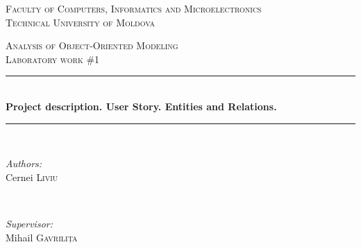 \documentclass[12pt,a4paper,titlepage]{article}
\begin{document}
\begin{titlepage}

  \begin{center} %

  \textsc{\large Faculty of Computers, Informatics and Microelectronics}\\[0.5cm]
  \textsc{\large Technical University of Moldova}\\[1.2cm] %
  \vspace{25 mm}

  \textsc{\Large Analysis of Object-Oriented Modeling}\\[0.5cm] %
  \textsc{\large Laboratory work \#1}\\[0.5cm] %

\newcommand{\HRule}{\rule{\linewidth}{0.5mm}} %

  \vspace{10 mm}
  \HRule \\[0.4cm]
  { \LARGE \bfseries Project description. User Story. Entities and Relations. }\\[0.4cm] %
  \HRule \\[1.5cm]

      \vspace{30mm}

      \begin{minipage}{0.4\textwidth}
      \begin{flushleft} \large
      \emph{Authors:}\\
      Cernei \textsc{Liviu}
      \end{flushleft}
      \end{minipage}
      ~
      \begin{minipage}{0.4\textwidth}
      \begin{flushright} \large
      \emph{Supervisor:} \\
      Mihail \textsc{Gavrilița} %
      \end{flushright}
      \end{minipage}\\[4cm]


\end{center}
\end{titlepage}
\end{document}

